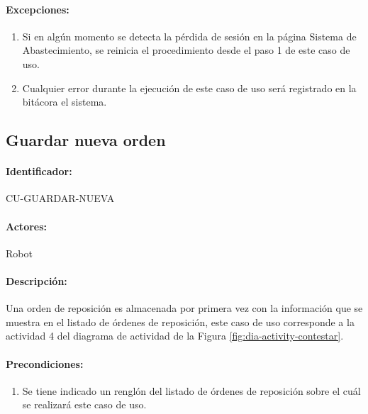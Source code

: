 \paragraph{Excepciones:}
\begin{enumerate}
  \item Si en algún momento se detecta la pérdida de sesión en la página Sistema de Abastecimiento, se reinicia el procedimiento desde el paso 1 de este caso de uso.
  \item Cualquier error durante la ejecución de este caso de uso será registrado en la bitácora el sistema.
\end{enumerate}


\subsection{Guardar nueva orden}\label{cu-guardar-nueva}
\paragraph{Identificador:}
CU-GUARDAR-NUEVA
\paragraph{Actores:}
Robot
\paragraph{Descripción:}
Una orden de reposición es almacenada por primera vez con la información que se muestra en el listado de órdenes de reposición, este caso de uso corresponde a la actividad 4 del diagrama de actividad de la Figura \ref{fig:dia-activity-contestar}.
\paragraph{Precondiciones:}
\begin{enumerate}
  \item Se tiene indicado un renglón del listado de órdenes de reposición sobre el cuál se realizará este caso de uso.
\end{enumerate}
